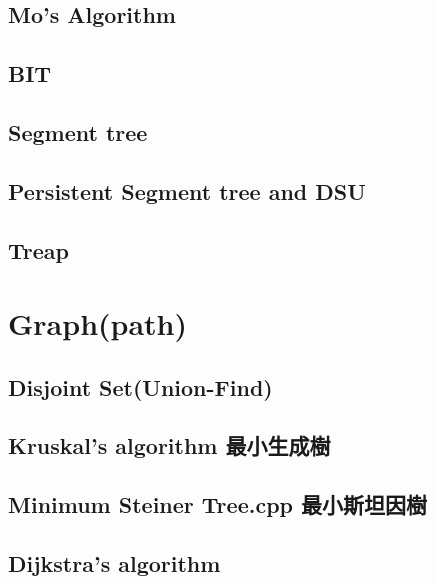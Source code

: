 \subsection{Mo's Algorithm}


\subsection{BIT}


\subsection{Segment tree}


\subsection{Persistent Segment tree and DSU}


\subsection{Treap}


\section{Graph(path)}

\subsection{Disjoint Set(Union-Find)}


\subsection{Kruskal’s algorithm 最小生成樹}


\subsection{Minimum Steiner Tree.cpp 最小斯坦因樹}


\subsection{Dijkstra’s algorithm}


